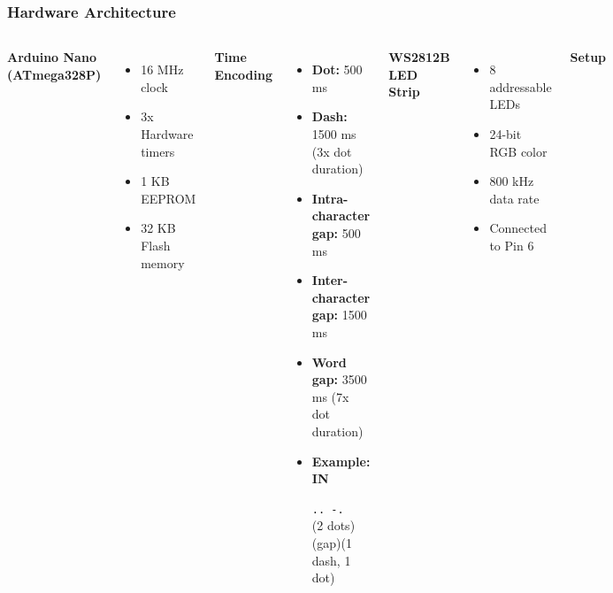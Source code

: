 \documentclass[aspectratio=169, 8pt]{beamer}
\begin{document}
	\begin{frame}[fragile,shrink=10]
		\frametitle{Hardware Architecture}
		\vspace{0.5cm}
		\begin{columns}
			\textbf{Arduino Nano (ATmega328P)}
			\begin{itemize}
				\item 16 MHz clock
				\item 3x Hardware timers
				\item 1 KB EEPROM
				\item 32 KB Flash memory
			\end{itemize}
			
			\vspace{0.5cm}
			\textbf{Time Encoding}
			\begin{itemize}
				\item \textbf{Dot:} 500 ms
				\item \textbf{Dash:} 1500 ms (3x dot duration)
				\item \textbf{Intra-character gap:} 500 ms
				\item \textbf{Inter-character gap:} 1500 ms
				\item \textbf{Word gap:} 3500 ms (7x dot duration)
				\item \textbf{Example: \glqq IN\grqq}
				\begin{center}
					\texttt{..  -.}\\
					\vspace{0.1cm}
					\small{(2 dots)(gap)(1 dash, 1 dot)}
				\end{center}
			\end{itemize}
			
			\vspace{0.5cm}
			\textbf{WS2812B LED Strip}
			\begin{itemize}
				\item 8 addressable LEDs
				\item 24-bit RGB color
				\item 800 kHz data rate
				\item Connected to Pin 6
			\end{itemize}
			
			\textbf{Setup}
			
			
		\end{columns}
	\end{frame}
	
\end{document}
